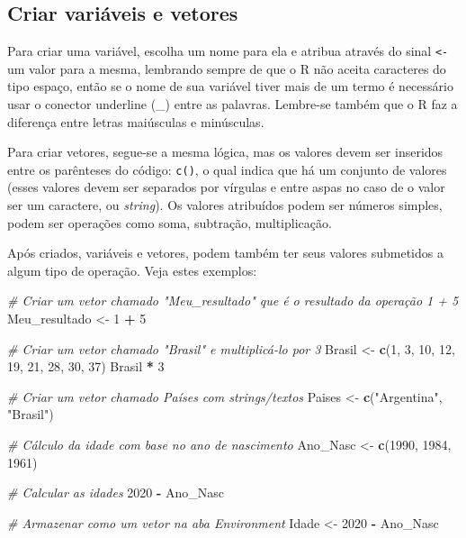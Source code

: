 \documentclass[
  10pt,
  brazil,
  a4paper,
  twoside, notitlepage, openright]{book}
\newenvironment{Shaded}{\begin{snugshade}}{\end{snugshade}}
\newcommand{\CommentTok}[1]{\textcolor[rgb]{0.56,0.35,0.01}{\textit{#1}}}
\newcommand{\DecValTok}[1]{\textcolor[rgb]{0.00,0.00,0.81}{#1}}
\newcommand{\KeywordTok}[1]{\textcolor[rgb]{0.13,0.29,0.53}{\textbf{#1}}}
\newcommand{\NormalTok}[1]{#1}
\newcommand{\OperatorTok}[1]{\textcolor[rgb]{0.81,0.36,0.00}{\textbf{#1}}}
\newcommand{\StringTok}[1]{\textcolor[rgb]{0.31,0.60,0.02}{#1}}
\begin{document}
\hypertarget{criar-variuxe1veis-e-vetores}{%
\subsection{Criar variáveis e vetores}\label{criar-variuxe1veis-e-vetores}}

Para criar uma variável, escolha um nome para ela e atribua através do sinal \texttt{\textless{}-} um valor para a mesma, lembrando sempre de que o R não aceita caracteres do tipo espaço, então se o nome de sua variável tiver mais de um termo é necessário usar o conector underline (\_) entre as palavras. Lembre-se também que o R faz a diferença entre letras maiúsculas e minúsculas.

Para criar vetores, segue-se a mesma lógica, mas os valores devem ser inseridos entre os parênteses do código: \texttt{c()}, o qual indica que há um conjunto de valores (esses valores devem ser separados por vírgulas e entre aspas no caso de o valor ser um caractere, ou \emph{string}). Os valores atribuídos podem ser números simples, podem ser operações como soma, subtração, multiplicação.

Após criados, variáveis e vetores, podem também ter seus valores submetidos a algum tipo de operação. Veja estes exemplos:

\begin{Shaded}
\begin{Highlighting}[]
\CommentTok{# Criar um vetor chamado "Meu_resultado" que é o resultado da operação 1 + 5}
\NormalTok{Meu_resultado <-}\StringTok{ }\DecValTok{1} \OperatorTok{+}\StringTok{ }\DecValTok{5}

\CommentTok{# Criar um vetor chamado "Brasil" e multiplicá-lo por 3}
\NormalTok{Brasil <-}\StringTok{ }\KeywordTok{c}\NormalTok{(}\DecValTok{1}\NormalTok{, }\DecValTok{3}\NormalTok{, }\DecValTok{10}\NormalTok{, }\DecValTok{12}\NormalTok{, }\DecValTok{19}\NormalTok{, }\DecValTok{21}\NormalTok{, }\DecValTok{28}\NormalTok{, }\DecValTok{30}\NormalTok{, }\DecValTok{37}\NormalTok{)}
\NormalTok{Brasil }\OperatorTok{*}\StringTok{ }\DecValTok{3}

\CommentTok{# Criar um vetor chamado Países com strings/textos}
\NormalTok{Paises <-}\StringTok{ }\KeywordTok{c}\NormalTok{(}\StringTok{"Argentina"}\NormalTok{, }\StringTok{"Brasil"}\NormalTok{) }

\CommentTok{# Cálculo da idade com base no ano de nascimento}
\NormalTok{Ano_Nasc <-}\StringTok{ }\KeywordTok{c}\NormalTok{(}\DecValTok{1990}\NormalTok{, }\DecValTok{1984}\NormalTok{, }\DecValTok{1961}\NormalTok{)}

\CommentTok{# Calcular as idades}
\DecValTok{2020} \OperatorTok{-}\StringTok{ }\NormalTok{Ano_Nasc}

\CommentTok{# Armazenar como um vetor na aba Environment}
\NormalTok{Idade <-}\StringTok{ }\DecValTok{2020} \OperatorTok{-}\StringTok{ }\NormalTok{Ano_Nasc}
\end{Highlighting}
\end{Shaded}
\end{document}
